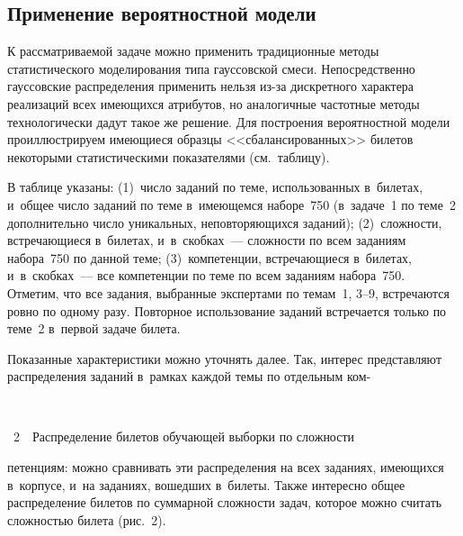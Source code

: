 \begin{multicols}{2}
\vspace*{-3pt}

\subsection{Применение вероятностной модели}

  К рассматриваемой задаче можно применить традиционные методы 
статистического моделирования типа гауссовской смеси. Непосредственно 
гауссовские распределения применить нельзя из-за дискретного характера 
реализаций всех имеющихся атрибутов, но аналогичные частотные методы 
технологически дадут такое же решение. Для построения вероятностной 
модели проиллюстрируем имеющиеся образцы <<сбалансированных>> 
билетов некоторыми статистическими показателями (см.\ таблицу).
  
  
  В таблице указаны: (1)~число заданий по теме, использованных в~билетах, и~общее число заданий по теме в~имеющемся наборе~750 (в~задаче~1 по 
теме~2 дополнительно число уникальных, неповторяющихся заданий); 
(2)~сложности, встречающиеся в~билетах, и~в~скобках~--- сложности по всем 
заданиям набора~750 по данной теме; (3)~компетенции, встречающиеся 
в~билетах, и~в~скобках~--- все компетенции по теме по всем заданиям 
набора~750. Отметим, что все задания, выбранные экспертами по темам~1,  
3--9, встречаются ровно по одному разу. Повторное использование заданий 
встречается только по теме~2 в~первой задаче билета.
  
  Показанные характеристики можно уточнять далее. Так, интерес 
представляют распределения заданий в~рамках каждой темы по отдельным 
ком-\linebreak\vspace*{-9.8pt}

{ \begin{center}  %
 \vspace*{-3pt}
    \mbox{%
\epsfxsize=79mm 
}

\end{center}



\noindent
{{\figurename~2}\ \ \small{Распределение билетов обучающей выборки по сложности
}}}

\vspace*{6pt}
\addtocounter{figure}{1}


  
  \noindent
  петенциям: можно сравнивать эти распределения на всех заданиях, 
имеющихся в~корпусе, и~на заданиях, вошедших в~билеты. Также интересно 
общее распределение билетов по суммарной слож\-ности задач, которое 
можно считать сложностью билета (рис.~2).
  

\end{multicols}
